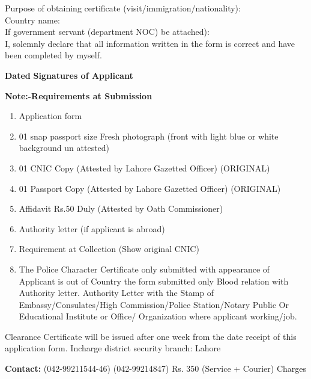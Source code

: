 \documentclass{article}
\begin{document}
Purpose of obtaining certificate (visit/immigration/nationality): \underline{\hspace{8cm}} \\
Country name: \underline{\hspace{8cm}} \\
If government servant (department NOC) be attached): \\
I, solemnly declare that all information written in the form is correct and have been completed by myself.

\textbf{Dated} \hspace{2cm} \underline{\hspace{4cm}} \hspace{2cm} \textbf{Signatures of Applicant} \hspace{2cm} \underline{\hspace{4cm}}

\textbf{Note:-Requirements at Submission}

\begin{enumerate}
    \item Application form
    \item 01 snap passport size Fresh photograph (front with light blue or white background un attested)
    \item 01 CNIC Copy (Attested by Lahore Gazetted Officer) (ORIGINAL)
    \item 01 Passport Copy (Attested by Lahore Gazetted Officer) (ORIGINAL)
    \item Affidavit Rs.50 Duly (Attested by Oath Commissioner)
    \item Authority letter (if applicant is abroad)
    \item Requirement at Collection (Show original CNIC)
    \item The Police Character Certificate only submitted with appearance of Applicant is out of Country the form submitted only Blood relation with Authority letter. Authority Letter with the Stamp of Embassy/Consulates/High Commission/Police Station/Notary Public Or Educational Institute or Office/ Organization where applicant working/job.
\end{enumerate}

Clearance Certificate will be issued after one week from the date receipt of this application form. Incharge district security branch: Lahore

\textbf{Contact:} (042-99211544-46) \hspace{1cm} (042-99214847) \hspace{1cm} Rs. 350 (Service + Courier) Charges
\end{document}
